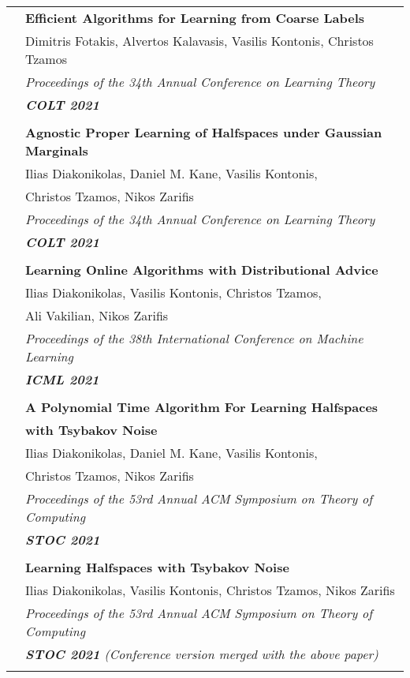 \documentclass[letterpaper,11pt,oneside]{article}
\begin{document}
\begin{longtable}{@{} l l}
 &\textbf{Efficient Algorithms for Learning from Coarse Labels}\\
 &  Dimitris Fotakis, Alvertos Kalavasis, Vasilis Kontonis, Christos Tzamos \\
 & \emph{Proceedings of the 34th Annual Conference on Learning Theory} \\
 & \emph{\textbf{COLT 2021}} \\
 & \\

&\textbf{Agnostic Proper Learning of Halfspaces under Gaussian Marginals}\\
& Ilias Diakonikolas, Daniel M. Kane, Vasilis Kontonis,\\
& Christos Tzamos, Nikos Zarifis \\
& \emph{Proceedings of the 34th Annual Conference on Learning Theory} \\
& \emph{\textbf{COLT 2021}} \\
& \\

     &\textbf{Learning Online Algorithms with Distributional Advice}\\
     & Ilias Diakonikolas, Vasilis Kontonis, Christos Tzamos,\\
     & Ali Vakilian, Nikos Zarifis \\
     & \emph{Proceedings of the 38th International Conference on Machine Learning} \\
     & \emph{\textbf{ICML 2021}} \\
     & \\

     &\textbf{A Polynomial Time Algorithm For Learning Halfspaces}\\
     & \textbf{with Tsybakov Noise}\\
     & Ilias Diakonikolas, Daniel M. Kane, Vasilis Kontonis,\\
     & Christos Tzamos, Nikos Zarifis \\
     & \emph{Proceedings of the 53rd Annual ACM Symposium on Theory of Computing}\\
     & \emph{\textbf{STOC 2021}} \\
     & \\

     &\textbf{Learning Halfspaces with Tsybakov Noise}\\
     & Ilias Diakonikolas, Vasilis Kontonis, Christos Tzamos, Nikos Zarifis \\
     & \emph{Proceedings of the 53rd Annual ACM Symposium on Theory of Computing} \\
     & \emph{\textbf{STOC 2021} 
     (Conference version merged with the above paper)
     } \\
     & \\




\end{longtable}
\end{document}

